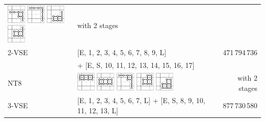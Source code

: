 \documentclass[runningheads]{llncs}
\begin{document}
\begin{tabular}{p{1.2cm}l@{~~}r}
\includegraphics[width=0.9cm]{figures/NTuple-74.pdf}
\includegraphics[width=0.9cm]{figures/NTuple-75.pdf}
\includegraphics[width=0.9cm]{figures/NTuple-76.pdf}
\includegraphics[width=0.9cm]{figures/NTuple-77.pdf}
& with 2 stages \\
2-VSE & [E, 1, 2, 3, 4, 5, 6, 7, 8, 9, L]         &  471\,794\,736  \\
      &  + [E, S, 10, 11, 12, 13, 14, 15, 16, 17] &                 \\\hline
\textsf{NT8}
&
\includegraphics[width=0.9cm]{figures/NTuple-80.pdf}
\includegraphics[width=0.9cm]{figures/NTuple-81.pdf}
\includegraphics[width=0.9cm]{figures/NTuple-82.pdf}
\includegraphics[width=0.9cm]{figures/NTuple-83.pdf}
\includegraphics[width=0.9cm]{figures/NTuple-84.pdf}
& with 2 stages \\
3-VSE & [E, 1, 2, 3, 4, 5, 6, 7, L] + [E, S, 8, 9, 10, 11, 12, 13, L] & 877\,730\,580 \\

\end{tabular}
\end{document}
